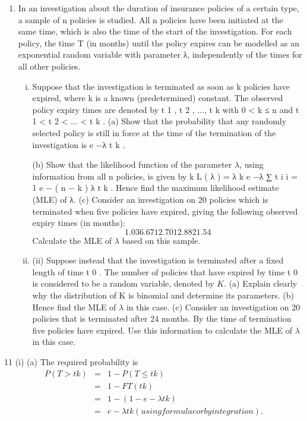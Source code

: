 \documentclass[a4paper,12pt]{article}
\begin{document}
\begin{enumerate}
\item In an investigation about the duration of insurance policies of a certain type, a sample of n policies is studied. All n policies have been initiated at the same time, which is also the time of the start of the investigation. For each policy, the time T (in months)
until the policy expires can be modelled as an exponential random variable with parameter λ, independently of the times for all other policies.
\begin{enumerate}[(i)]
\item %
Suppose that the investigation is terminated as soon as k policies have expired, where k is a known (predetermined) constant. The observed policy expiry times are denoted by t 1 , t 2 , ..., t k with 0 < k ≤ n and t 1 < t 2 < ... < t k .
(a) Show that the probability that any randomly selected policy is still in force at the time of the termination of the investigation is e −λ t k .

(b) Show that the likelihood function of the parameter $\lambda$, using information from all n policies, is given by
k
L ( λ ) = λ k e
−λ ∑ t i
i = 1
e − ( n − k ) λ t k .
Hence find the maximum likelihood estimate (MLE) of λ.
(c)
Consider an investigation on 20 policies which is terminated when five policies have expired, giving the following observed expiry times (in
months):
\[1.03 6.67 12.70 12.88 21.54\]
Calculate the MLE of $\lambda$ based on this sample.

\item (ii)
Suppose instead that the investigation is terminated after a fixed length of time t 0 . The number of policies that have expired by time t 0 is considered to be a random variable, denoted by $K$.
(a) Explain clearly why the distribution of K is binomial and determine its parameters.
(b) Hence find the MLE of $\lambda$ in this case.
(c) Consider an investigation on 20 policies that is terminated after 24 months. By the time of termination five policies have expired.
Use this information to calculate the MLE of $\lambda$ in this case.

\end{enumerate}
\end{enumerate}
\newpage
11
(i)
(a)
The required probability is
\begin{eqnarray*}
P ( T > t k ) &=& 1 − P ( T ≤ t k ) \\
&=& 1 − F T ( t k )\\
&=& 1 − (1 − e −λ t k ) \\
&=& e − \lambda  t k (using formulae or by integration).\\
\end{eqnarray*}
\end{document}
